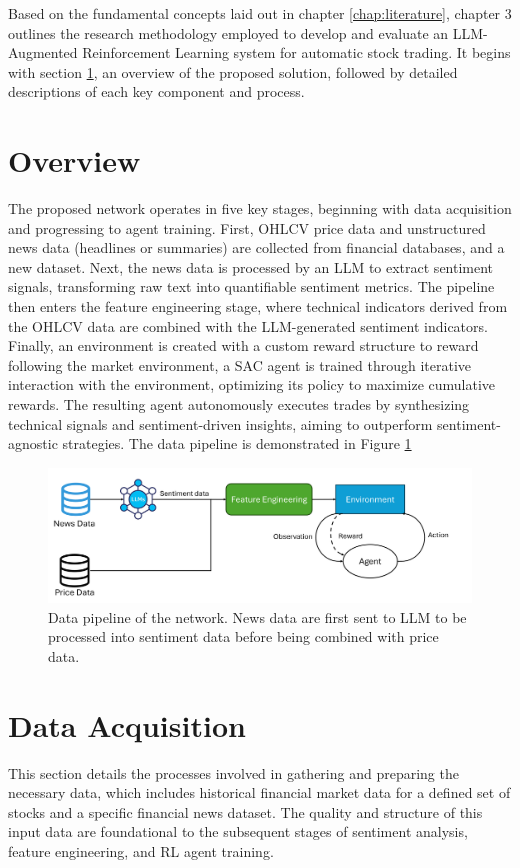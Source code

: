 Based on the fundamental concepts laid out in chapter \ref{chap:literature}, chapter 3  outlines the research methodology employed to develop and evaluate an \gls{LLM}-Augmented Reinforcement Learning system for automatic stock trading. It begins with section \ref{sec:overview}, an overview of the proposed solution, followed by detailed descriptions of each key component and process.

\section{Overview}
\label{sec:overview}
The proposed network operates in five key stages, beginning with data acquisition and progressing to agent training. First, \gls{OHLCV} price data and unstructured news data (headlines or summaries) are collected from financial databases, and a new dataset. Next, the news data is processed by an \gls{LLM} to extract sentiment signals, transforming raw text into quantifiable sentiment metrics. The pipeline then enters the feature engineering stage, where technical indicators derived from the \gls{OHLCV} data are combined with the \gls{LLM}-generated sentiment indicators. Finally, an environment is created with a custom reward structure to reward following the market environment, a \gls{SAC} agent is trained through iterative interaction with the environment, optimizing its policy to maximize cumulative rewards. The resulting agent autonomously executes trades by synthesizing technical signals and sentiment-driven insights, aiming to outperform sentiment-agnostic strategies. The data pipeline is demonstrated in Figure \ref{fig:pipeline}

\begin{figure}
  \centering
  \includegraphics[width=\linewidth]{images/LLM-RL.png}
  \caption{Data pipeline of the network. News data are first sent to LLM to be processed into sentiment data before being combined with price data.}
  \label{fig:pipeline}
\end{figure}

\section{Data Acquisition}
\label{sec:data}
This section details the processes involved in gathering and preparing the necessary data, which includes historical financial market data for a defined set of stocks and a specific financial news dataset. The quality and structure of this input data are foundational to the subsequent stages of sentiment analysis, feature engineering, and \gls{RL} agent training.


